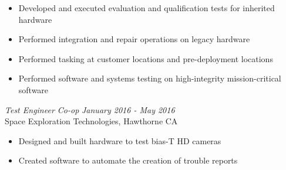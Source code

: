\documentclass[line,mmmargin]{res}
\begin{document}
\begin{resume}
\begin{itemize}
		\item Developed and executed evaluation and qualification tests for inherited hardware
		\item Performed integration and repair operations on legacy hardware
		\item Performed tasking at customer locations and pre-deployment locations
		\item Performed software and systems testing on high-integrity mission-critical software
	\end{itemize}
	\vspace{-10pt}
{\sl  Test Engineer Co-op} \hfill {\sl January 2016 - May 2016}\\
	Space Exploration Technologies, Hawthorne CA
	\begin{itemize}  \itemsep -2pt %
		\item Designed and built hardware to test bias-T HD cameras
		\item Created software to automate the creation of trouble reports
	\end{itemize}
 


\end{resume}
\end{document}
